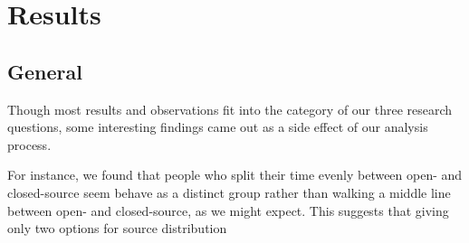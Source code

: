 \section{Results}\label{results}




\subsection{General}
Though most results and observations fit into the category of our three research questions, some interesting findings came out as a side effect of our analysis process.

For instance, we found that people who split their time evenly between open- and closed-source seem behave as a distinct group rather than walking a middle line between open- and closed-source, as we might expect. This suggests that giving only two options for source distribution 